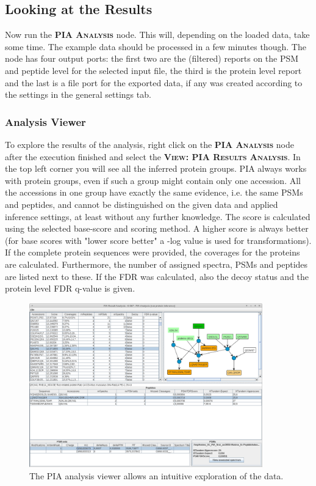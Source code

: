 \documentclass[a4paper,11pt,twoside]{article}
\newcommand{\menu}[1]{{\scshape\bfseries #1}}
\newcommand{\knimenode}[1]{{\scshape\bfseries #1}}
\begin{document}
\subsection{Looking at the Results}

Now run the \knimenode{PIA Analysis} node. This will, depending on the loaded
data, take some time. The example data should be processed in a few minutes
though. The node has four output ports: the first two are the (filtered)
reports on the PSM and peptide level for the selected input file, the third is
the protein level report and the last is a file port for the exported data, if
any was created according to the settings in the general settings tab.


\subsubsection{Analysis Viewer}

To explore the results of the analysis, right click on the \knimenode{PIA
Analysis} node after the execution finished and select the \menu{View: PIA
Results Analysis}. In the top left corner you will see all the inferred protein
groups. PIA always works with protein groups, even if such a group might
contain only one accession. All the accessions in one group have exactly the
same evidence, i.e. the same PSMs and peptides, and cannot be distinguished on
the given data and applied inference settings, at least without any further
knowledge. The score is calculated using the selected base-score and scoring
method. A higher score is always better (for base scores with "lower score
better" a -log value is used for transformations). If the complete protein
sequences were provided, the coverages for the proteins are calculated.
Furthermore, the number of assigned spectra, PSMs and peptides are listed next
to these. If the FDR was calculated, also the decoy status and the protein level
FDR q-value is given.

\begin{figure}[ht!]
	\centering
	\includegraphics[width=0.9\textwidth]{graphics/screenshot_PIA_analysis}
	\caption{The PIA analysis viewer allows an intuitive exploration of the
	data.}
	\label{pia_analysis}
\end{figure}
\end{document}
